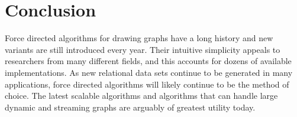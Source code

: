 \documentclass[notitlepage,letter,11pt]{article}
\begin{document}
\section{Conclusion}
Force directed algorithms for drawing graphs have a long history and
new variants are still introduced every year. Their intuitive
simplicity appeals to researchers from many different fields, and this
accounts for dozens of available implementations. As new relational data
sets continue to be generated in many applications, force directed algorithms will likely
continue to be the method of choice. The latest scalable algorithms
and algorithms that can handle large dynamic and streaming graphs are
arguably of greatest utility today.




\end{document}
